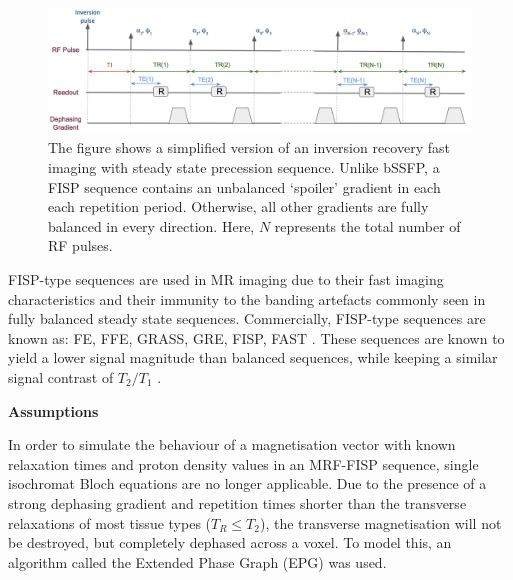 \begin{figure}[ht]
    \centering
    \includegraphics[angle=0,width=1\textwidth, keepaspectratio]{images/mrf/sequenceFISP}
    \caption{The figure shows a simplified version of an inversion recovery fast imaging with steady state precession sequence. 
    Unlike bSSFP, a FISP sequence contains an unbalanced `spoiler' gradient in each each repetition period.
    Otherwise, all other gradients are fully balanced in every direction.
    Here, $N$ represents the total number of RF pulses.}
    \label{fig:sequenceFISP}
\end{figure}

\hfill

FISP-type sequences are used in MR imaging due to their fast imaging characteristics and their immunity to the banding artefacts commonly seen in fully balanced steady state sequences. 
Commercially, FISP-type sequences are known as: FE, FFE, GRASS, GRE, FISP, FAST \cite{Hargreaves2012}.
These sequences are known to yield a lower signal magnitude than balanced sequences, while keeping a similar signal contrast of $T_2/T_1$ \cite{Hargreaves2012}.

\hfill

\large \textbf{Assumptions} \normalsize

In order to simulate the behaviour of a magnetisation vector with known relaxation times and proton density values in an MRF-FISP sequence, single isochromat Bloch equations are no longer applicable.
Due to the presence of a strong dephasing gradient and repetition times shorter than the transverse relaxations of most tissue types \big($T_R \leq T_2$\big), the transverse magnetisation will not be destroyed, but completely dephased across a voxel.
To model this, an algorithm called the Extended Phase Graph (EPG) \cite{Hennig1988} \cite{Hennig1991} was used.

\hfill 

